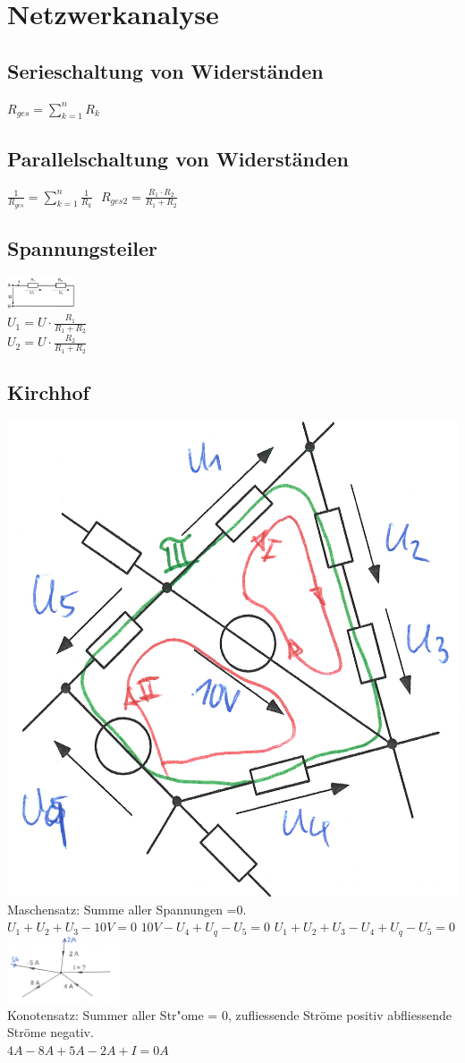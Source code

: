 \newpage
\section{Netzwerkanalyse}

\begin{multicols}{2}
\subsection{Serieschaltung von Widerständen}
$ R_{ges} = \sum\limits_{k=1}^{n}{R_k} $ \\

\subsection{Parallelschaltung von Widerständen}
$ \frac{1}{R_{ges}} = \sum\limits_{k=1}^{n}\frac{1}{R_k}\ \ \ R_{ges2} = \frac{R_1 \cdot R_2}{R_1 + R_2} $ \\

\subsection{Spannungsteiler}
\includegraphics[width=0.15\textwidth]{pics/spannungsteiler}\\
$ U_1 = U \cdot \frac{R_1}{R_1 + R_2}$ \\
$ U_2 = U \cdot \frac{R_2}{R_1 + R_2}$ \\

\end{multicols}

\subsection{Kirchhof}
\begin{multicols}{4}
\includegraphics[width=0.15 \textwidth]{pics/kirchhof/masche}\\
Maschensatz: Summe aller Spannungen =0.\\
	$U_1+U_2+U_3-10V=0$
	$10V-U_4+U_q-U_5=0$
	$U_1+U_2+U_3-U_4+U_q-U_5=0$\\
\includegraphics[width=0.25\textwidth]{pics/kirchhof/knoten}\\
Konotensatz: Summer aller Str"ome = 0, zufliessende Ströme positiv abfliessende Ströme negativ.\\
$4A-8A+5A-2A+I=0A$\\
\end{multicols}


